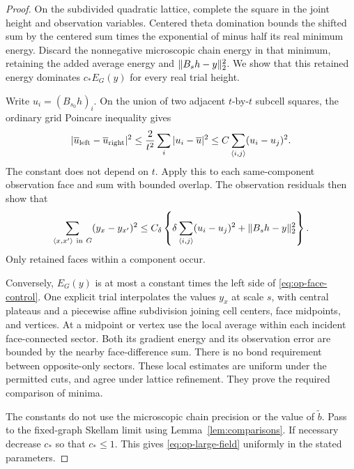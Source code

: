 \begin{proof}
On the subdivided quadratic lattice, complete the square in the
joint height and observation variables.  Centered theta
domination bounds the shifted sum by the centered sum times
the exponential of minus half its real minimum energy.
Discard the nonnegative microscopic chain energy in that
minimum, retaining the added average energy and
\(\lVert B_sh-y\rVert_2^2\).  We show that this retained energy
dominates \(c_*E_G(y)\) for every real trial height.

Write \(u_i=(B_{s_0}h)_i\).  On the union of two adjacent
\(t\)-by-\(t\) subcell squares, the ordinary grid Poincare
inequality gives
\begin{equation}\label{eq:op-two-cell}
 |\overline u_{\rm left}-\overline u_{\rm right}|^2
 \leq \frac{2}{t^2}\sum_i|u_i-\overline u|^2
 \leq C\sum_{\langle i,j\rangle}(u_i-u_j)^2.
\end{equation}
The constant does not depend on \(t\).  Apply this to each
same-component observation face and sum with bounded overlap.
The observation residuals then show that
\begin{equation}\label{eq:op-face-control}
 \sum_{\langle x,x'\rangle\ {\rm in}\ G}(y_x-y_{x'})^2
 \leq C_\delta\left\{
       \delta\sum_{\langle i,j\rangle}(u_i-u_j)^2
                          +\lVert B_sh-y\rVert_2^2\right\}.
\end{equation}
Only retained faces within a component occur.

Conversely, \(E_G(y)\) is at most a constant times the left
side of \eqref{eq:op-face-control}.  One explicit trial
interpolates the values \(y_x\) at scale \(s\), with central
plateaus and a piecewise affine subdivision joining cell
centers, face midpoints, and vertices.  At a midpoint or vertex
use the local average within each incident face-connected
sector.  Both its gradient energy and its observation error
are bounded by the nearby face-difference sum.  There is no
bond requirement between opposite-only sectors.  These local
estimates are uniform under the permitted cuts, and agree
under lattice refinement.  They prove the required comparison
of minima.

The constants do not use the microscopic chain precision or
the value of \(\widetilde b\).  Pass to the fixed-graph Skellam
limit using Lemma~\ref{lem:comparisons}.  If necessary decrease
\(c_*\) so that \(c_*\leq1\).  This gives
\eqref{eq:op-large-field} uniformly in the stated parameters.
\end{proof}

